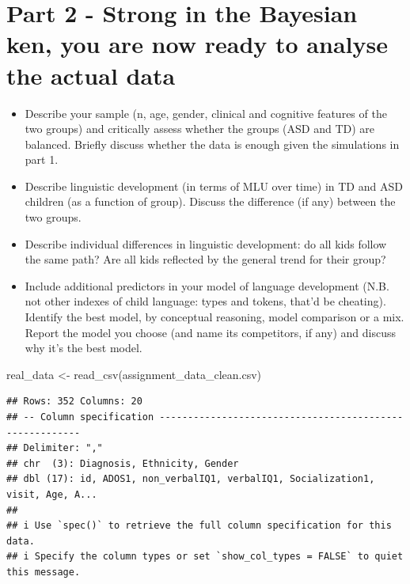 \documentclass[
]{article}
\newenvironment{Shaded}{\begin{snugshade}}{\end{snugshade}}
\newcommand{\FunctionTok}[1]{\textcolor[rgb]{0.00,0.00,0.00}{#1}}
\newcommand{\NormalTok}[1]{#1}
\newcommand{\OtherTok}[1]{\textcolor[rgb]{0.56,0.35,0.01}{#1}}
\newcommand{\StringTok}[1]{\textcolor[rgb]{0.31,0.60,0.02}{#1}}
\begin{document}
\hypertarget{part-2---strong-in-the-bayesian-ken-you-are-now-ready-to-analyse-the-actual-data}{%
\section{Part 2 - Strong in the Bayesian ken, you are now ready to
analyse the actual
data}\label{part-2---strong-in-the-bayesian-ken-you-are-now-ready-to-analyse-the-actual-data}}

\begin{itemize}
\item
  Describe your sample (n, age, gender, clinical and cognitive features
  of the two groups) and critically assess whether the groups (ASD and
  TD) are balanced. Briefly discuss whether the data is enough given the
  simulations in part 1.
\item
  Describe linguistic development (in terms of MLU over time) in TD and
  ASD children (as a function of group). Discuss the difference (if any)
  between the two groups.
\item
  Describe individual differences in linguistic development: do all kids
  follow the same path? Are all kids reflected by the general trend for
  their group?
\item
  Include additional predictors in your model of language development
  (N.B. not other indexes of child language: types and tokens, that'd be
  cheating). Identify the best model, by conceptual reasoning, model
  comparison or a mix. Report the model you choose (and name its
  competitors, if any) and discuss why it's the best model.
\end{itemize}

\begin{Shaded}
\begin{Highlighting}[]
\NormalTok{real\_data }\OtherTok{\textless{}{-}} \FunctionTok{read\_csv}\NormalTok{(}\StringTok{\textquotesingle{}assignment\_data\_clean.csv\textquotesingle{}}\NormalTok{)}
\end{Highlighting}
\end{Shaded}

\begin{verbatim}
## Rows: 352 Columns: 20
## -- Column specification --------------------------------------------------------
## Delimiter: ","
## chr  (3): Diagnosis, Ethnicity, Gender
## dbl (17): id, ADOS1, non_verbalIQ1, verbalIQ1, Socialization1, visit, Age, A...
## 
## i Use `spec()` to retrieve the full column specification for this data.
## i Specify the column types or set `show_col_types = FALSE` to quiet this message.
\end{verbatim}
\end{document}
